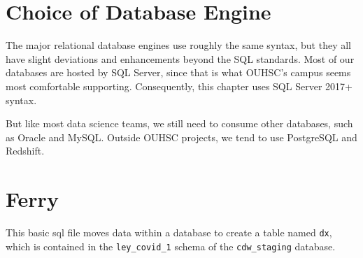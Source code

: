 \documentclass[
]{book}
\begin{document}
\hypertarget{sql-choice}{%
\section{Choice of Database Engine}\label{sql-choice}}

The major relational database engines use roughly the same syntax, but they all have slight deviations and enhancements beyond the SQL standards. Most of our databases are hosted by SQL Server, since that is what OUHSC's campus seems most comfortable supporting. Consequently, this chapter uses SQL Server 2017+ syntax.

But like most data science teams, we still need to consume other databases, such as Oracle and MySQL. Outside OUHSC projects, we tend to use PostgreSQL and Redshift.

\hypertarget{sql-ferry}{%
\section{Ferry}\label{sql-ferry}}

This basic sql file moves data within a database to create a table named \texttt{dx}, which is contained in the \texttt{ley\_covid\_1} schema of the \texttt{cdw\_staging} database.
\end{document}
